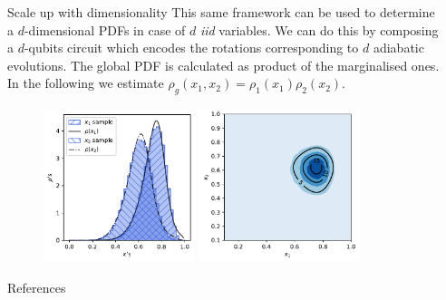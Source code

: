 \documentclass[20pt, final]{beamer}
\newlength{\sepwidth}
\newlength{\colwidth}
\newcommand{\separatorcolumn}{\begin{column}{\sepwidth}\end{column}}
\begin{document}
\begin{frame}[t]
\begin{columns}[t]
\begin{column}{\colwidth}
  \begin{block}{Scale up with dimensionality}
  This same framework can be used to determine a $d$-dimensional PDFs in case of
  $d$ \textit{iid} variables. We can do this by composing a $d$-qubits circuit 
  which encodes the rotations corresponding to $d$ adiabatic evolutions.
  The global PDF is calculated as product of the marginalised ones. In the following 
  we estimate $\rho_g(x_1,x_2) = \rho_1(x_1)\rho_2(x_2).$
  \begin{figure}
    \includegraphics[width=0.415\textwidth]{figures/2pdfs.pdf}%
    \includegraphics[width=0.44\textwidth]{figures/contour.pdf}%
  \end{figure}
  \end{block}

\vspace{-1cm}
\begin{block}{References}
  \nocite{*}
    \small  {}
  \end{block}
\end{column}

\separatorcolumn
\end{columns}
\end{frame}
\end{document}
